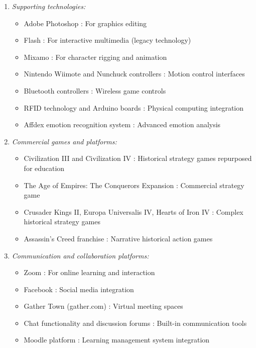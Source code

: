\documentclass[a4paper,fleqn]{cas-sc}
\begin{document}
\begin{enumerate}[noitemsep]
	\item 
\textit{Supporting technologies:}
\begin{itemize}[noitemsep]
 \item Adobe Photoshop \citep{1Barbatsis201159, 2Mahamarowi2023133}: For graphics editing
 \item Flash \citep{1Barbatsis201159}: For interactive multimedia (legacy technology)
 \item Mixamo \citep{2Mahamarowi2023133}: For character rigging and animation
 \item Nintendo Wiimote and Nunchuck controllers \citep{39Tegos2014838}: Motion control interfaces
 \item Bluetooth controllers \citep{5kazanidis2018alpha}: Wireless game controls
 \item RFID technology and Arduino boards \citep{73Wolfartsberger2011160}: Physical computing integration
 \item Affdex emotion recognition system \citep{32Cheng20241718}: Advanced emotion analysis
\end{itemize}

	\item 
\textit{Commercial games and platforms:}
\begin{itemize}[noitemsep]
 \item Civilization III and Civilization IV \citep{55Squire2004, 59Kee2014270, 65Razak201139, 66Rahmawati2023163, 67Lin201296, 70Hou201519}: Historical strategy games repurposed for education
 \item The Age of Empires: The Conquerors Expansion \citep{8Yu2014}: Commercial strategy game
 \item Crusader Kings II, Europa Universalis IV, Hearts of Iron IV \citep{51Ardito2007}: Complex historical strategy games
 \item Assassin's Creed franchise \citep{12Gilbert2019108, 61Karsenti202027}: Narrative historical action games
\end{itemize}

	\item 
\textit{Communication and collaboration platforms:}
\begin{itemize}[noitemsep]
 \item Zoom \citep{42Huffer201581}: For online learning and interaction
 \item Facebook \citep{49Huizenga2007127, 62Milosz201896, 69Wong2017150, 77Ramansyah2021}: Social media integration
 \item Gather Town (gather.com) \citep{74Fendt2019}: Virtual meeting spaces
 \item Chat functionality and discussion forums \citep{17Manzanares2019, 62Milosz201896, 79Fernes2024379}: Built-in communication tools
 \item Moodle platform \citep{17Manzanares2019}: Learning management system integration
\end{itemize}


\end{enumerate}
\end{document}
